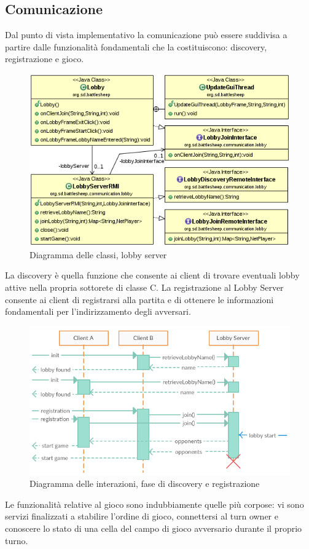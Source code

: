 
\subsection{Comunicazione}
Dal punto di vista implementativo la comunicazione può essere suddivisa a 
partire dalle funzionalità fondamentali che la costituiscono: discovery, registrazione e gioco.

\begin{figure}[!ht]
    \centering
    \includegraphics[scale=0.55,center]{core/imgs/UML/LobbyCommunicationUML-noattr.png}
    \caption{Diagramma delle classi, lobby server}
    \label{fig:classlobby}
\end{figure}

La discovery è quella funzione che consente ai client di trovare eventuali 
lobby attive nella propria sottorete di classe C. La registrazione al Lobby 
Server consente ai client di registrarsi alla partita e di ottenere le 
informazioni fondamentali per l'indirizzamento degli avversari. 

\begin{figure}[!ht]
    \centering
    \includegraphics[scale=0.55,center]{core/imgs/UML/sequence/discovery.png}
    \caption{Diagramma delle interazioni, fase di discovery e registrazione}
    \label{fig:discoveryseq}
\end{figure}Le funzionalità 
relative al gioco sono indubbiamente quelle più corpose: vi sono servizi 
finalizzati a stabilire l'ordine di gioco, connettersi al turn owner e 
conoscere lo stato di una cella del campo di gioco avversario durante il 
proprio turno.

